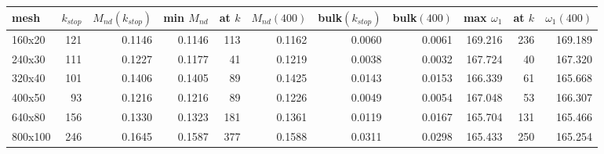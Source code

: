 \setlength{\tabcolsep}{3.5pt}
\begin{tabular}{lrrrrrrrrrr}
\toprule
mesh & $k_{stop}$ & $M_{nd}(k_{stop})$ & min $M_{nd}$ & at $k$ & $M_{nd}(400)$ & bulk$(k_{stop})$ & bulk$(400)$ & max $\omega_1$ & at $k$ & $\omega_1(400)$ \\
\midrule
160x20 & 121 & 0.1146 & 0.1146 & 113 & 0.1162 & 0.0060 & 0.0061 & 169.216 & 236 & 169.189 \\
240x30 & 111 & 0.1227 & 0.1177 & 41 & 0.1219 & 0.0038 & 0.0032 & 167.724 & 40 & 167.320 \\
320x40 & 101 & 0.1406 & 0.1405 & 89 & 0.1425 & 0.0143 & 0.0153 & 166.339 & 61 & 165.668 \\
400x50 & 93 & 0.1216 & 0.1216 & 89 & 0.1226 & 0.0049 & 0.0054 & 167.048 & 53 & 166.307 \\
640x80 & 156 & 0.1330 & 0.1323 & 181 & 0.1361 & 0.0119 & 0.0167 & 165.704 & 131 & 165.466 \\
800x100 & 246 & 0.1645 & 0.1587 & 377 & 0.1588 & 0.0311 & 0.0298 & 165.433 & 250 & 165.254 \\
\bottomrule
\end{tabular}
